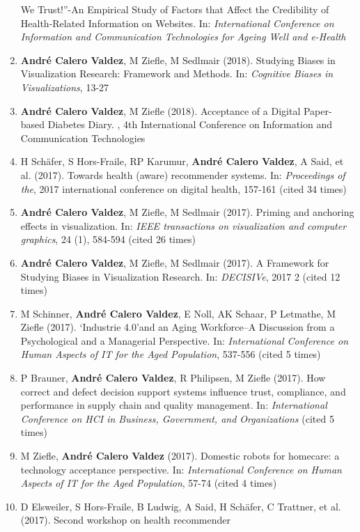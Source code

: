 \documentclass[11pt,a4paper,sans]{moderncv}
\begin{document}
\begin{enumerate}
  We Trust!''-An Empirical Study of Factors that Affect the Credibility
  of Health-Related Information on Websites. In: \emph{International
  Conference on Information and Communication Technologies for Ageing
  Well and e-Health}
\item
  \textbf{André Calero Valdez}, M Ziefle, M Sedlmair (2018). Studying
  Biases in Visualization Research: Framework and Methods. In:
  \emph{Cognitive Biases in Visualizations}, 13-27
\item
  \textbf{André Calero Valdez}, M Ziefle (2018). Acceptance of a Digital
  Paper-based Diabetes Diary. , 4th International Conference on
  Information and Communication Technologies~
\item
  H Schäfer, S Hors-Fraile, RP Karumur, \textbf{André Calero Valdez}, A
  Said, et al. (2017). Towards health (aware) recommender systems. In:
  \emph{Proceedings of the}, 2017 international conference on digital
  health, 157-161 (cited 34 times)
\item
  \textbf{André Calero Valdez}, M Ziefle, M Sedlmair (2017). Priming and
  anchoring effects in visualization. In: \emph{IEEE transactions on
  visualization and computer graphics}, 24 (1), 584-594 (cited 26 times)
\item
  \textbf{André Calero Valdez}, M Ziefle, M Sedlmair (2017). A Framework
  for Studying Biases in Visualization Research. In: \emph{DECISIVe},
  2017 2 (cited 12 times)
\item
  M Schinner, \textbf{André Calero Valdez}, E Noll, AK Schaar, P
  Letmathe, M Ziefle (2017). `Industrie 4.0'and an Aging Workforce--A
  Discussion from a Psychological and a Managerial Perspective. In:
  \emph{International Conference on Human Aspects of IT for the Aged
  Population}, 537-556 (cited 5 times)
\item
  P Brauner, \textbf{André Calero Valdez}, R Philipsen, M Ziefle (2017).
  How correct and defect decision support systems influence trust,
  compliance, and performance in supply chain and quality management.
  In: \emph{International Conference on HCI in Business, Government, and
  Organizations} (cited 5 times)
\item
  M Ziefle, \textbf{André Calero Valdez} (2017). Domestic robots for
  homecare: a technology acceptance perspective. In: \emph{International
  Conference on Human Aspects of IT for the Aged Population}, 57-74
  (cited 4 times)
\item
  D Elsweiler, S Hors-Fraile, B Ludwig, A Said, H Schäfer, C Trattner,
  et al. (2017). Second workshop on health recommender

\end{enumerate}
\end{document}
